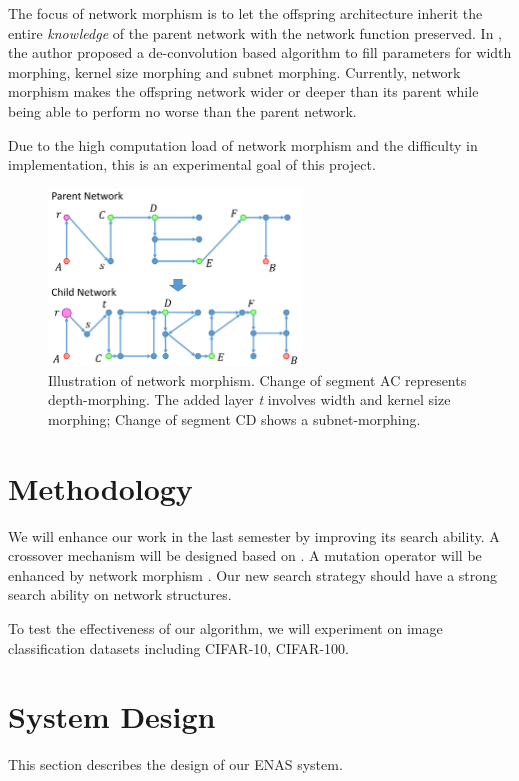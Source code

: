 \documentclass{article}
\begin{document}
\begin{normalsize}
   The focus of network morphism is to let the offspring architecture inherit the entire \textit{knowledge} of the parent network with the network function preserved. In \cite{wei2016network}, the author proposed a de-convolution based algorithm to fill parameters for width morphing, kernel size morphing and subnet morphing. Currently, network morphism makes the offspring network wider or deeper than its parent while being able to perform no worse than the parent network. 

   Due to the high computation load of network morphism and the difficulty in implementation, this is an experimental goal of this project.
   \begin{figure}[H]
      \centering
      \includegraphics[width=0.6\textwidth]{figures/morph.png}
    \caption{Illustration of network morphism\cite{wei2016network}. Change of segment AC represents depth-morphing. The added layer \textit{t} involves width and kernel size morphing; Change of segment CD shows a subnet-morphing.}
    \label{morphing}
   \end{figure}

   \section{Methodology}
   We will enhance our work in the last semester by improving its search ability. A crossover mechanism will be designed based on \cite{zhu2019eena}. A mutation operator will be enhanced by network morphism \cite{wei2016network}. Our new search strategy should have a strong search ability on network structures.

   To test the effectiveness of our algorithm, we will experiment on image classification datasets including CIFAR-10, CIFAR-100.

   \section{System Design}
   This section describes the design of our ENAS system.

\end{normalsize}
\end{document}
